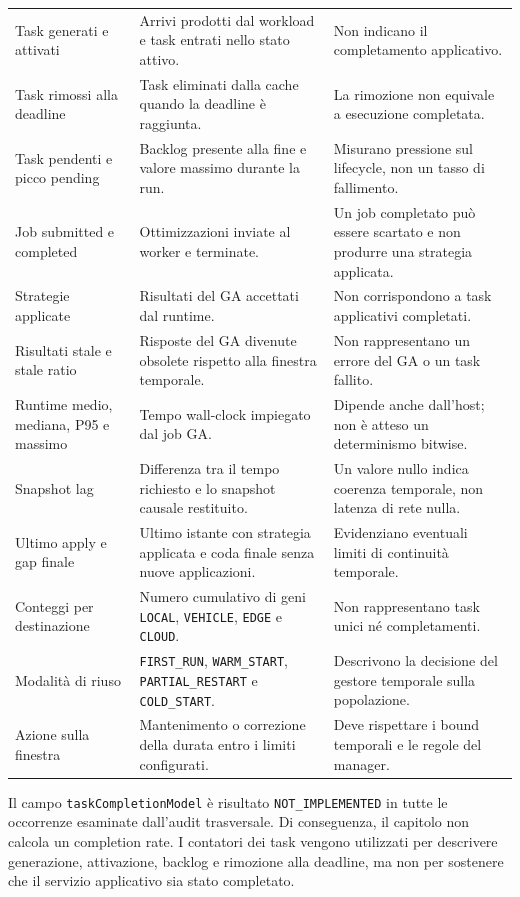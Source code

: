 \begin{longtable}{
    >{\raggedright\arraybackslash}p{}
    >{\raggedright\arraybackslash}p{}
    >{\raggedright\arraybackslash}p{}
}
    Task generati e attivati &
    Arrivi prodotti dal workload e task entrati nello stato attivo. &
    Non indicano il completamento applicativo. \\
    Task rimossi alla deadline &
    Task eliminati dalla cache quando la deadline è raggiunta. &
    La rimozione non equivale a esecuzione completata. \\
    Task pendenti e picco pending &
    Backlog presente alla fine e valore massimo durante la run. &
    Misurano pressione sul lifecycle, non un tasso di fallimento. \\
    Job submitted e completed &
    Ottimizzazioni inviate al worker e terminate. &
    Un job completato può essere scartato e non produrre una strategia applicata. \\
    Strategie applicate &
    Risultati del GA accettati dal runtime. &
    Non corrispondono a task applicativi completati. \\
    Risultati stale e stale ratio &
    Risposte del GA divenute obsolete rispetto alla finestra temporale. &
    Non rappresentano un errore del GA o un task fallito. \\
    Runtime medio, mediana, P95 e massimo &
    Tempo wall-clock impiegato dal job GA. &
    Dipende anche dall'host; non è atteso un determinismo bitwise. \\
    Snapshot lag &
    Differenza tra il tempo richiesto e lo snapshot causale restituito. &
    Un valore nullo indica coerenza temporale, non latenza di rete nulla. \\
    Ultimo apply e gap finale &
    Ultimo istante con strategia applicata e coda finale senza nuove applicazioni. &
    Evidenziano eventuali limiti di continuità temporale. \\
    Conteggi per destinazione &
    Numero cumulativo di geni \texttt{LOCAL}, \texttt{VEHICLE}, \texttt{EDGE} e \texttt{CLOUD}. &
    Non rappresentano task unici né completamenti. \\
    Modalità di riuso &
    \texttt{FIRST\_RUN}, \texttt{WARM\_START}, \texttt{PARTIAL\_RESTART} e \texttt{COLD\_START}. &
    Descrivono la decisione del gestore temporale sulla popolazione. \\
    Azione sulla finestra &
    Mantenimento o correzione della durata entro i limiti configurati. &
    Deve rispettare i bound temporali e le regole del manager. \\
\end{longtable}
\endgroup

Il campo \texttt{taskCompletionModel} è risultato \texttt{NOT\_IMPLEMENTED} in tutte le occorrenze esaminate dall'audit trasversale. Di conseguenza, il capitolo non calcola un completion rate. I contatori dei task vengono utilizzati per descrivere generazione, attivazione, backlog e rimozione alla deadline, ma non per sostenere che il servizio applicativo sia stato completato.

